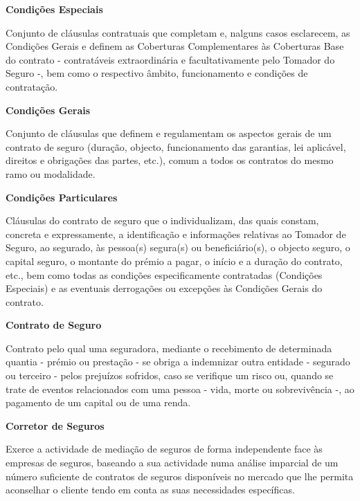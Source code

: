 \begin{description}
\item \textbf{Condições Especiais}

Conjunto de cláusulas contratuais que completam e, nalguns casos esclarecem, as Condições Gerais e definem as Coberturas Complementares às Coberturas Base do contrato - contratáveis extraordinária e facultativamente pelo Tomador do Seguro -, bem como o respectivo âmbito, funcionamento e condições de contratação.
\end{description}

\begin{description}
\item \textbf{Condições Gerais}

Conjunto de cláusulas que definem e regulamentam os aspectos gerais de um contrato de seguro (duração, objecto, funcionamento das garantias, lei aplicável, direitos e obrigações das partes, etc.), comum a todos os contratos do mesmo ramo ou modalidade.
\end{description}

\begin{description}
\item \textbf{Condições Particulares}

Cláusulas do contrato de seguro que o individualizam, das quais constam, concreta e expressamente, a identificação e informações relativas ao Tomador de Seguro, ao segurado, às pessoa(s) segura(s) ou beneficiário(s), o objecto seguro, o capital seguro, o montante do prémio a pagar, o início e a duração do contrato, etc., bem como todas as condições especificamente contratadas (Condições Especiais) e as eventuais derrogações ou excepções às Condições Gerais do contrato.
\end{description}

\begin{description}
\item \textbf{Contrato de Seguro}

Contrato pelo qual uma seguradora, mediante o recebimento de determinada quantia - prémio ou prestação - se obriga a indemnizar outra entidade - segurado ou terceiro - pelos prejuízos sofridos, caso se verifique um risco ou, quando se trate de eventos relacionados com uma pessoa - vida, morte ou sobrevivência -, ao pagamento de um capital ou de uma renda.
\end{description}

\begin{description}
\item \textbf{Corretor de Seguros}

Exerce a actividade de mediação de seguros de forma independente face às empresas de seguros, baseando a sua actividade numa análise imparcial de um número suficiente de contratos de seguros disponíveis no mercado que lhe permita aconselhar o cliente tendo em conta as suas necessidades específicas.
\end{description}

